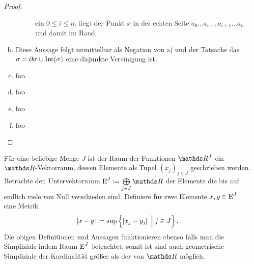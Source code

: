 \begin{Satz}
\begin{proof}
\begin{enumerate}[a):]
\begin{description}
        ein $0 \leq i \leq n$, liegt der Punkt $x$ in der echten Seite
        $a_0 \ldots a_{i-1} a_{i+1} \ldots a_n$ und damit im Rand.
      \end{description}
    \item Diese Aussage folgt unmittelbar als Negation von a) und der
      Tatsache das $\sigma = \partial\sigma \cup \operatorname{Int}(\sigma)$ eine
      disjunkte Vereinigung ist.
    \item foo
    \item foo
    \item foo
    \item foo
    \end{enumerate}
  \end{proof}
\end{Satz}


\begin{Bem}
  Für eine beliebige Menge $J$ ist der Raum der Funktionen $\R^J$ ein
  $\R$-Vektorraum, dessen Elemente als Tupel $(x_j)_{j \in J}$
  geschrieben werden. Betrachte den Untervektorraum
  $\E^J \coloneqq \bigoplus\limits_{j \in J} \R$ der Elemente die bis
  auf endlich viele von Null verschieden sind. Definiere für zwei
  Elemente $x,y \in \operatorname{E}^J$ eine Metrik
  \begin{gather*}
    \left| x-y \right| \coloneqq \sup \left\{  \left| x_j - y_j  \right|  \; \Big| \;  j \in J \right\}.
  \end{gather*}
  Die obigen Definitionen und Aussagen funktionieren ebenso falls man
  die Simpliziale indem Raum $\operatorname{E}^J$ betrachtet, somit ist sind 
  auch geometrische Simpliziale der Kardinalität größer als der von $\R$
  möglich.
\end{Bem}




